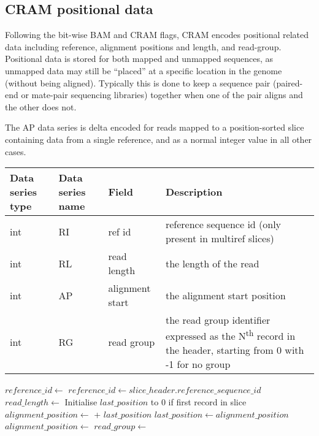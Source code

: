 \documentclass[a4paper]{article}
\begin{document}
\subsection{\textbf{CRAM positional data}}
\label{subsec:positions}

Following the bit-wise BAM and CRAM flags, CRAM encodes positional related data including reference, alignment positions and length, and read-group.
Positional data is stored for both mapped and unmapped sequences, as unmapped data may still be ``placed'' at a specific location in the genome (without being aligned).
Typically this is done to keep a sequence pair (paired-end or mate-pair sequencing libraries) together when one of the pair aligns and the other does not.

The AP data series is delta encoded for reads mapped to a position-sorted slice containing data from a single reference, and as a normal integer value in all other cases.

\begin{tabular}{|>{\raggedright}p{70pt}|>{\raggedright}p{75pt}|>{\raggedright}p{90pt}|>{\raggedright}p{171pt}|}
\hline
\textbf{Data series type} & \textbf{Data series name} & \textbf{Field} & \textbf{Description}\tabularnewline
\hline
int & RI & ref id & reference sequence id (only present in multiref slices)\tabularnewline
\hline
int & RL & read length & the length of the read\tabularnewline
\hline
int & AP & alignment start & the alignment start position\tabularnewline
\hline
int & RG & read group & the read group identifier expressed as the N\textsuperscript{th} record in the header, starting from 0 with -1 for no group\tabularnewline
\hline
\end{tabular}

\vskip 20pt
\begin{algorithmic}[1]
  \State $reference\_id\gets$ 
\Else
  \State $reference\_id\gets slice\_header.reference\_sequence\_id$
\EndIf
\State $read\_length \gets$ 
    \State Initialise $last\_position$ to 0 if first record in slice
    \State $alignment\_position \gets$  + $last\_position$
    \State $last\_position \gets alignment\_position$
\Else
    \State $alignment\_position \gets$ 
\EndIf
\State $read\_group \gets$ 
\EndProcedure
\end{algorithmic}
\end{document}
